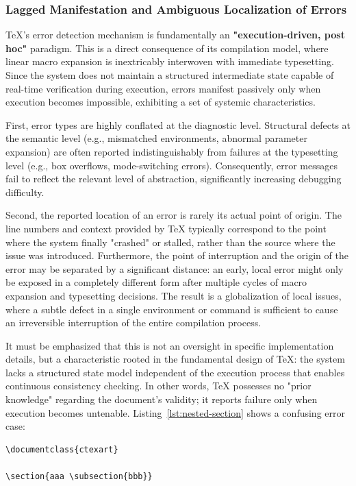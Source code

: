 \subsubsection{Lagged Manifestation and Ambiguous Localization of Errors}

\TeX{}'s error detection mechanism is fundamentally an \textbf{"execution-driven, post hoc"} paradigm. This is a direct consequence of its compilation model, where linear macro expansion is inextricably interwoven with immediate typesetting. Since the system does not maintain a structured intermediate state capable of real-time verification during execution, errors manifest passively only when execution becomes impossible, exhibiting a set of systemic characteristics.

First, error types are highly conflated at the diagnostic level. Structural defects at the semantic level (e.g., mismatched environments, abnormal parameter expansion) are often reported indistinguishably from failures at the typesetting level (e.g., box overflows, mode-switching errors). Consequently, error messages fail to reflect the relevant level of abstraction, significantly increasing debugging difficulty.

Second, the reported location of an error is rarely its actual point of origin. The line numbers and context provided by \TeX{} typically correspond to the point where the system finally "crashed" or stalled, rather than the source where the issue was introduced. Furthermore, the point of interruption and the origin of the error may be separated by a significant distance: an early, local error might only be exposed in a completely different form after multiple cycles of macro expansion and typesetting decisions. The result is a globalization of local issues, where a subtle defect in a single environment or command is sufficient to cause an irreversible interruption of the entire compilation process.

It must be emphasized that this is not an oversight in specific implementation details, but a characteristic rooted in the fundamental design of \TeX{}: the system lacks a structured state model independent of the execution process that enables continuous consistency checking. In other words, \TeX{} possesses no "prior knowledge" regarding the document's validity; it reports failure only when execution becomes untenable. Listing~\ref{lst:nested-section} shows a confusing error case:

\begin{lstlisting}[caption={Nested section commands},label={lst:nested-section}]
\documentclass{ctexart}

\section{aaa \subsection{bbb}}

\end{lstlisting}

